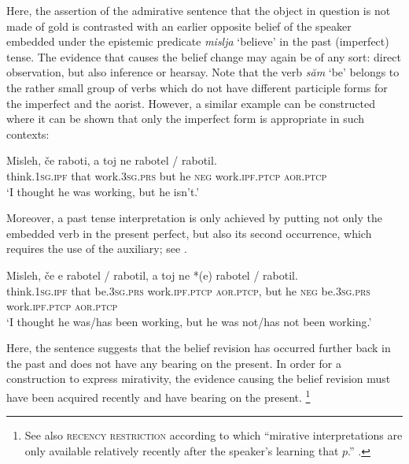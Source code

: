 \documentclass[output=paper,
colorlinks,
citecolor=brown,
newtxmath
]{langscibook}
\begin{document}
\noindent Here, the assertion of the admirative sentence that the object in question is not made of gold is contrasted with an earlier opposite belief of the speaker embedded under the epistemic predicate \textit{mislja} `believe' in the past (imperfect) tense. The evidence that causes the belief change may again be of any sort: direct observation, but also inference or hearsay. Note that the verb \textit{săm} `be' belongs to the rather small group of verbs which do not have different participle forms for the imperfect and the aorist. However, a similar example can be constructed where it can be shown that only the imperfect form is appropriate in such contexts:

\ea \label{ex:misleh2}
\gll Misleh, če raboti, a toj ne rabotel / \minsp{*} rabotil. \\
think.\textsc{1sg.ipf} that work.\textsc{3sg.prs} but he \textsc{neg} work.\textsc{ipf.ptcp} {} {} \textsc{aor.ptcp} \\
\glt `I thought he was working, but he isn't.'
\z

\noindent Moreover, a past tense interpretation is only achieved by putting not only the embedded verb in the present perfect, but also its second occurrence, which requires the use of the auxiliary; see .

\ea \label{ex:misleh3}
\gll Misleh, če e rabotel / rabotil, a toj ne *(e) rabotel / rabotil. \\
think.\textsc{1sg.ipf} that be.\textsc{3sg.prs} work.\textsc{ipf.ptcp} {} \textsc{aor.ptcp}, but he \textsc{neg} \phantom{*(}be.\textsc{3sg.prs} work.\textsc{ipf.ptcp} {} \textsc{aor.ptcp} \\
\glt `I thought he was/has been working, but he was not/has not been working.'
\z

\noindent Here, the sentence suggests that the belief revision has occurred further back in the past and does not have any bearing on the present. In order for a construction to express mirativity, the evidence causing the belief revision must have been acquired recently and have bearing on the present.%
\footnote{See also  \textsc{recency restriction} according to which ``mirative interpretations are only available relatively recently after the speaker's learning that $p$.'' \citep[464]{Rett.Murray2013}.}
\end{document}
